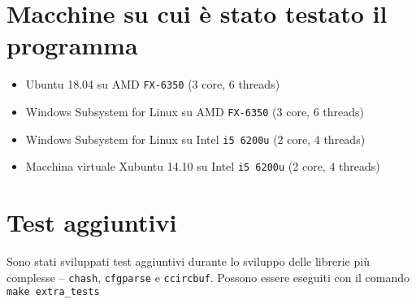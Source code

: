 \documentclass[11pt]{article} %
\begin{document}
\begin{appendices}
\section{Macchine su cui è stato testato il programma}
\begin{itemize}
\item Ubuntu 18.04 su AMD \texttt{FX-6350} (3 core, 6 threads)
\item Windows Subsystem for Linux su AMD \texttt{FX-6350} (3 core, 6 threads)
\item Windows Subsystem for Linux su Intel \texttt{i5 6200u} (2 core, 4 threads)
\item Macchina virtuale Xubuntu 14.10 su Intel \texttt{i5 6200u} (2 core, 4 threads)
\end{itemize}

\section{Test aggiuntivi}
Sono stati sviluppati test aggiuntivi durante lo sviluppo delle librerie più complesse -- \texttt{chash}, \texttt{cfgparse} e \texttt{ccircbuf}. Possono essere eseguiti con il comando \texttt{make extra\_tests}
\end{appendices}
\end{document}

